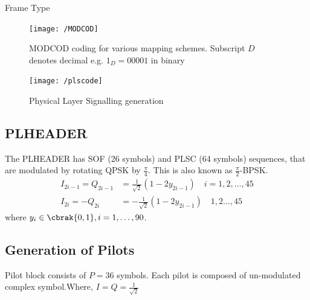 \documentclass[journal,12pt,twocolumn]{IEEEtran}
\begin{document}
%
\begin{table}[!ht]
\begin{center}
{\tiny

}
\end{center}
\caption{Frame Type}
\label{table:type}
\end{table}

\begin{figure}[!ht]
\begin{center}
\texttt{[image: /MODCOD]}
\end{center}
\caption{MODCOD coding for various mapping schemes. Subscript $D$ denotes decimal e.g. $1_D = 00001$ in binary}
\label{fig:modcod}
\end{figure}
%
%
\begin{figure}[!ht]
\begin{center}
\texttt{[image: /plscode]}
\end{center}
\caption{Physical Layer Signalling generation}
\label{fig:pls gen}
\end{figure}
%
\subsection{PLHEADER}
The PLHEADER has SOF (26 symbols) and PLSC (64 symbols) sequences, that are modulated by rotating QPSK by $\frac{\pi}{4}$.  This is also known as  $\frac{\pi}{2}$-BPSK. 
 \begin{align}\label{eq:1}
I_{2i-1}=Q_{2i-1}&=\frac{1}{\sqrt{2}}(1-2y_{2i-1}) \quad i=1,2,\dots,45
\\
\label{eq:2}
I_{2i}=-Q_{2i}&=-\frac{1}{\sqrt{2}}(1-2y_{2i-1}) \quad 1,2\dots,45
\end{align}
%
where $y_i \in \cbrak{0,1},i = 1,\dots,90$.
 
\subsection{Generation of Pilots}
%
Pilot block consists of $P=36$ symbols. Each pilot is composed of un-modulated complex symbol.Where, $I=Q=\frac{1}{\sqrt{2}}$ 
\end{document}

